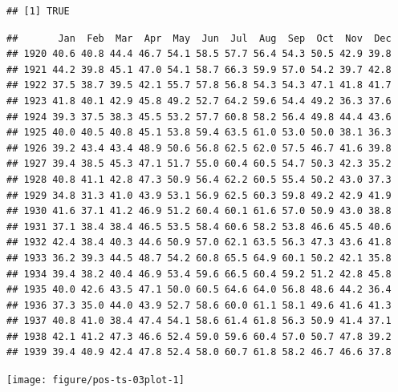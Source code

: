\documentclass[krantz2]{krantz}\usepackage{knitr}
\begin{document}
\begin{knitrout}\footnotesize
{}\color{fgcolor}\begin{kframe}
\begin{alltt}
\end{alltt}
\begin{verbatim}
## [1] TRUE
\end{verbatim}
\begin{alltt}
\end{alltt}
\begin{verbatim}
##       Jan  Feb  Mar  Apr  May  Jun  Jul  Aug  Sep  Oct  Nov  Dec
## 1920 40.6 40.8 44.4 46.7 54.1 58.5 57.7 56.4 54.3 50.5 42.9 39.8
## 1921 44.2 39.8 45.1 47.0 54.1 58.7 66.3 59.9 57.0 54.2 39.7 42.8
## 1922 37.5 38.7 39.5 42.1 55.7 57.8 56.8 54.3 54.3 47.1 41.8 41.7
## 1923 41.8 40.1 42.9 45.8 49.2 52.7 64.2 59.6 54.4 49.2 36.3 37.6
## 1924 39.3 37.5 38.3 45.5 53.2 57.7 60.8 58.2 56.4 49.8 44.4 43.6
## 1925 40.0 40.5 40.8 45.1 53.8 59.4 63.5 61.0 53.0 50.0 38.1 36.3
## 1926 39.2 43.4 43.4 48.9 50.6 56.8 62.5 62.0 57.5 46.7 41.6 39.8
## 1927 39.4 38.5 45.3 47.1 51.7 55.0 60.4 60.5 54.7 50.3 42.3 35.2
## 1928 40.8 41.1 42.8 47.3 50.9 56.4 62.2 60.5 55.4 50.2 43.0 37.3
## 1929 34.8 31.3 41.0 43.9 53.1 56.9 62.5 60.3 59.8 49.2 42.9 41.9
## 1930 41.6 37.1 41.2 46.9 51.2 60.4 60.1 61.6 57.0 50.9 43.0 38.8
## 1931 37.1 38.4 38.4 46.5 53.5 58.4 60.6 58.2 53.8 46.6 45.5 40.6
## 1932 42.4 38.4 40.3 44.6 50.9 57.0 62.1 63.5 56.3 47.3 43.6 41.8
## 1933 36.2 39.3 44.5 48.7 54.2 60.8 65.5 64.9 60.1 50.2 42.1 35.8
## 1934 39.4 38.2 40.4 46.9 53.4 59.6 66.5 60.4 59.2 51.2 42.8 45.8
## 1935 40.0 42.6 43.5 47.1 50.0 60.5 64.6 64.0 56.8 48.6 44.2 36.4
## 1936 37.3 35.0 44.0 43.9 52.7 58.6 60.0 61.1 58.1 49.6 41.6 41.3
## 1937 40.8 41.0 38.4 47.4 54.1 58.6 61.4 61.8 56.3 50.9 41.4 37.1
## 1938 42.1 41.2 47.3 46.6 52.4 59.0 59.6 60.4 57.0 50.7 47.8 39.2
## 1939 39.4 40.9 42.4 47.8 52.4 58.0 60.7 61.8 58.2 46.7 46.6 37.8
\end{verbatim}
\end{kframe}
\end{knitrout}



\begin{knitrout}\footnotesize
{}\color{fgcolor}\begin{kframe}
\begin{alltt}
\end{alltt}
\end{kframe}

{\centering \texttt{[image: figure/pos-ts-03plot-1]} 

}


\end{knitrout}
\end{document}
